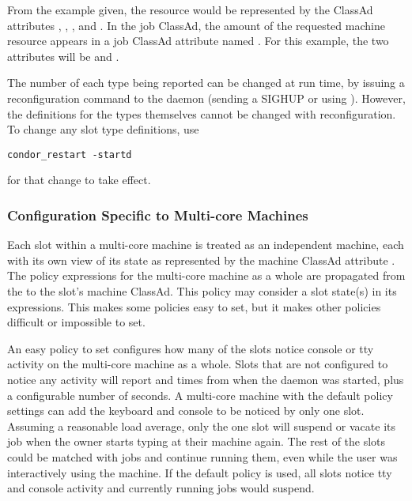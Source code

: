 \begin{description}
From the example given, the  resource would be represented by
the ClassAd attributes
, , , and .
In the job ClassAd, 
the amount of the requested machine resource appears 
in a job ClassAd attribute named .
For this example,
the two attributes will be  and .

The number of each type being
reported can be changed at run time, by issuing a reconfiguration
command to
the  daemon (sending a SIGHUP or using ).
However, the definitions for the types themselves cannot be changed
with reconfiguration.
To change any slot type definitions, use 
\begin{verbatim}
condor_restart -startd
\end{verbatim}
for that change to take effect.

\end{description}

\subsubsection{\label{sec:Config-SMP-Policy}
Configuration Specific to Multi-core Machines}

Each slot within a multi-core machine is treated as an
independent machine,
each with its own view of its state as represented by the
machine ClassAd attribute .
The policy expressions for the multi-core machine
as a whole are propagated from the 
to the slot's machine ClassAd.
This policy may consider a slot state(s) in its expressions.
This makes some policies easy to set, but it makes
other policies difficult or impossible to set.

An easy policy to set
configures how many of the slots
notice console or tty activity on the multi-core machine as a whole.
Slots that are not configured to notice any activity will report
 and  times from when the
 daemon was started,
plus a configurable number of seconds.
A multi-core machine with the default policy
settings can add the keyboard and console to be noticed by only one slot.
Assuming a reasonable load average,
only the one slot will suspend or vacate its job
when the owner starts typing at their machine again.
The rest of the slots could be matched with jobs and continue running them,
even while the user was interactively using the
machine. 
If the default policy is used,
all slots notice
tty and console activity
and
currently running jobs would suspend.

